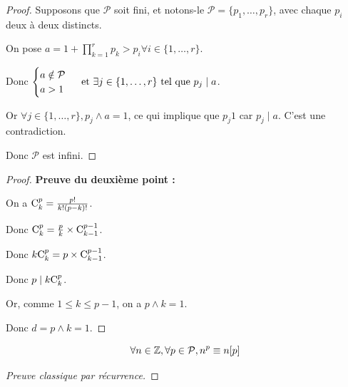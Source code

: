 \documentclass[12pt,a4paper]{report}
\begin{document}
\begin{proof}
    Supposons que $\mathcal{P}$ soit fini, et notons-le $\mathcal{P} = \{p_1,\dots,p_r\}$, avec chaque $p_i$ deux à deux distincts.

    On pose $a = 1 + \prod_{k=1}^{r} p_k > p_i \forall i \in \{1,\dots,r\}$.

    Donc $\begin{cases}
    a \notin \mathcal{P}\\
    a > 1
    \end{cases}\text{ et } \exists j \in \{1,\dots,r\} \text{ tel que } p_j \mid a$.

    Or $\forall j \in \{1,\dots,r\}, p_j \wedge a = 1$, ce qui implique que $p_j 1$ car $p_j \mid a$. C'est une contradiction.

    Donc $\mathcal{P}$ est infini.
\end{proof}

\begin{proof}
    \textbf{Preuve du deuxième point :}

    On a $\mathrm{C}_{k}^{p} = \frac{p!}{k!(p-k)!}$.

    Donc $\mathrm{C}_{k}^{p} = \frac pk \times \mathrm{C}_{k-1}^{p-1}$.

    Donc $k\mathrm{C}_{k}^{p} = p \times \mathrm{C}_{k-1}^{p-1}$.

    Donc $p \mid k \mathrm{C}_{k}^{p}$.

    Or, comme $1 \le k \le p-1$, on a $p \wedge k = 1$.

    Donc $d = p \wedge k = 1$.
\end{proof}

\begin{theorem}
    $$\forall n \in \mathbb{Z},\forall p \in \mathcal{P}, n^p \equiv n [p]$$
\end{theorem}

\begin{proof}[Preuve classique par récurrence]
    
\end{proof}
\end{document}
